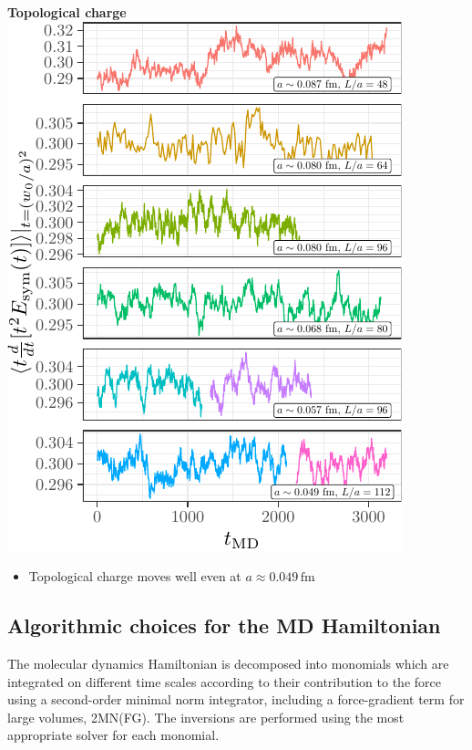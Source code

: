 \documentclass[a0,portrait]{a0poster}
\begin{document}
\begin{multicols}{2}
\begin{minipage}{0.48\linewidth}
        \centering
        \textbf{\hspace{3cm}Topological charge}\\
        \includegraphics[width=\linewidth,page=2]{data/gf_observables/gf_observables_md_histories}
        \begin{itemize}
            \item Topological charge moves well even at $a\approx 0.049 \, \mathrm{fm}$
        \end{itemize}
    \end{minipage}

    \subsection*{Algorithmic choices for the MD Hamiltonian}
    \noindent The molecular dynamics Hamiltonian is decomposed into monomials which are integrated on different time scales according to their contribution to the force using a second-order minimal norm integrator, including a force-gradient term for large volumes, 2MN(FG). The inversions are performed using the most appropriate solver for each monomial.
    \vspace{0.5cm}


\end{multicols}
\end{document}
